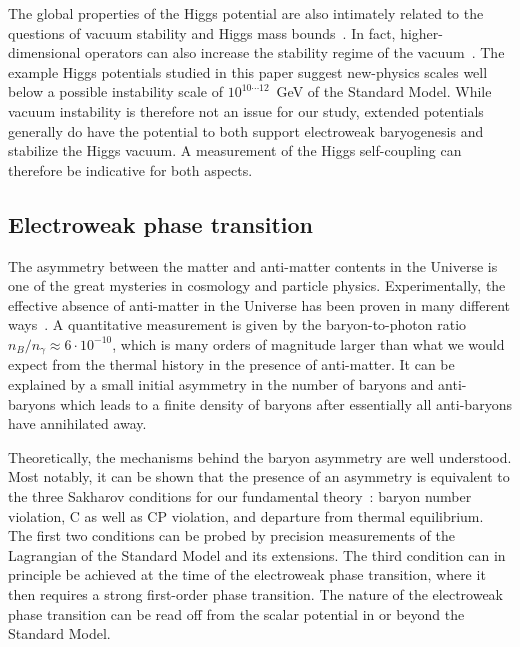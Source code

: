 \documentclass[aps,prd,11pt,tightenlines,superscriptaddress,nofootinbib,preprintnumbers,notitlepage]{revtex4-1}
\begin{document}
The global properties of the Higgs potential are also intimately
related to the questions of vacuum stability and Higgs mass
bounds~\cite{Krive:1976sg,Lindner:1985uk,Buttazzo:2013uya}. In fact,
higher-dimensional operators can also increase the stability regime of the
vacuum~\cite{Branchina:2005tu,Gies:2013fua,eichhorn_scherer,our_paper,Akerlund:2015fya,stable_frg,Jakovac:2015kka}.
The example Higgs potentials studied in this paper suggest new-physics
scales well below a possible instability scale of 
$10^{10\cdots12}$~GeV of the Standard Model. While vacuum instability
is therefore not an issue for our study, extended potentials generally
do have the potential to both support electroweak baryogenesis and
stabilize the Higgs vacuum. A measurement of the Higgs self-coupling
can therefore be indicative for both aspects.


\subsection{Electroweak phase transition}
\label{sec:phase}

The asymmetry between the matter and anti-matter contents in the
Universe is one of the great mysteries in cosmology and particle
physics. Experimentally, the effective absence of anti-matter in the
Universe has been proven in many different
ways~\cite{antimatter_meas}. A quantitative measurement is given by
the baryon-to-photon ratio $n_B/n_\gamma \approx 6 \cdot 10^{-10}$,
which is many orders of magnitude larger than what we would expect
from the thermal history in the presence of anti-matter. It can be
explained by a small initial asymmetry in the number of baryons and
anti-baryons which leads to a finite density of baryons after
essentially all anti-baryons have annihilated away.

Theoretically, the mechanisms behind the baryon asymmetry are well
understood. Most notably, it can be shown that the presence of an
asymmetry is equivalent to the three Sakharov conditions for our
fundamental theory~\cite{ew_phase}: baryon number violation, C as well
as CP violation, and departure from thermal equilibrium. The first two
conditions can be probed by precision measurements of the Lagrangian
of the Standard Model and its extensions.  The third condition can in
principle be achieved at the time of the electroweak phase transition,
where it then requires a strong first-order phase transition. The
nature of the electroweak phase transition can be read off from the scalar
potential in or beyond the Standard Model.
\end{document}
